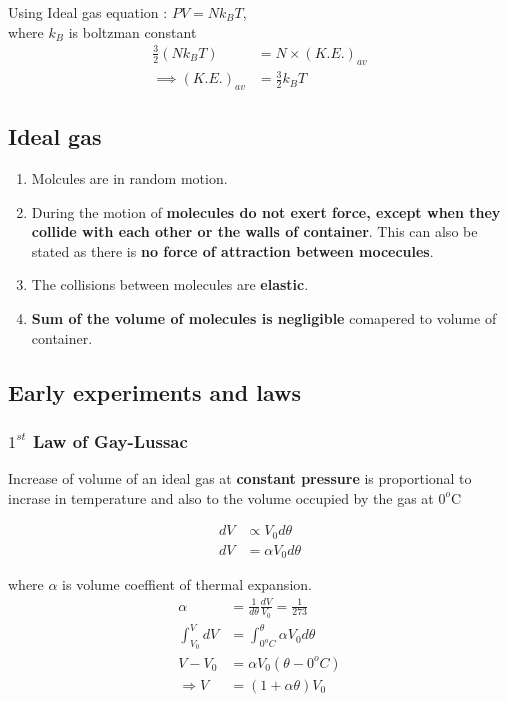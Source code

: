 \documentclass[fleqn,10pt]{SelfArx} %
\begin{document}
Using Ideal gas equation : $PV=Nk_BT$,\\ where $k_B$ is boltzman constant 
\begin{align}
   \frac{3}{2} (Nk_BT) &= N \times(K.E.)_{av}\\ 
   \implies (K.E.)_{av}&= \frac{3}{2} k_BT
\end{align}

\subsection{Ideal gas}
\begin{enumerate}[noitemsep]
    \item Molcules are in random motion. 
    \item During the motion of \textbf{molecules do not exert force, except when they collide with each other or the walls of container}. This can also be stated as there is \textbf{no force of attraction between mocecules}.
    \item The collisions between molecules are \textbf{elastic}.
    \item \textbf{Sum of the volume of molecules is negligible} comapered to volume of container.
\end{enumerate}

\subsection{Early experiments and laws}
\subsubsection*{$1^{st}$ Law of Gay-Lussac}
Increase of volume of an ideal gas at \textbf{constant pressure} is proportional to incrase in temperature and also to the volume occupied by the gas at $0^o$C

\begin{align}
    dV &\propto V_0 d\theta \\
    dV &= \alpha V_0 d\theta
\end{align}

where $\alpha$ is volume coeffient of thermal expansion.
\begin{align}
    \alpha &= \frac{1}{d \theta} \frac{dV}{V_0} = \frac{1}{273} \\
    \int_{V_0}^{V} dV &= \int_{0^oC}^{\theta} \alpha V_0 d\theta \\
    V - V_0 &= \alpha V_0(\theta - 0^oC) \\
    \Rightarrow V &= (1+\alpha\theta)V_0
\end{align}
\end{document}
